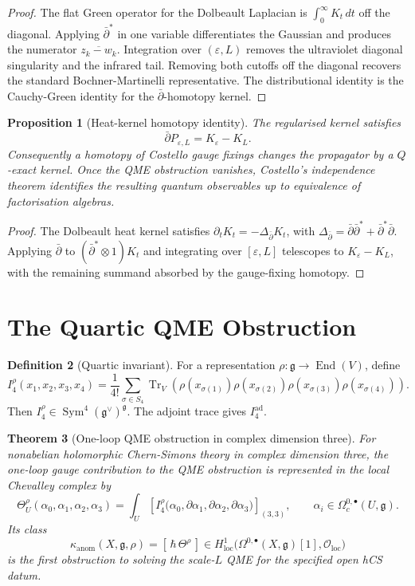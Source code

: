 \documentclass[11pt]{article}
\providecommand{\dbar}{\bar{\partial}}
\providecommand{\dbarstar}{\bar{\partial}^{\ast}}
\providecommand{\fg}{\mathfrak{g}}
\providecommand{\ad}{\operatorname{ad}}
\providecommand{\Tr}{\operatorname{Tr}}
\providecommand{\Sym}{\operatorname{Sym}}
\providecommand{\End}{\operatorname{End}}
\providecommand{\cO}{\mathcal{O}}
\providecommand{\kanom}{\kappa_{\mathrm{anom}}}
\theoremstyle{plain}
\newtheorem{theorem}{Theorem}[section]
\newtheorem{proposition}[theorem]{Proposition}
\theoremstyle{definition}
\newtheorem{definition}[theorem]{Definition}
\theoremstyle{remark}
\begin{document}
\begin{proof}
The flat Green operator for the Dolbeault Laplacian is
\(\int_0^\infty K_t\,dt\) off the diagonal. Applying
\(\dbarstar\) in one variable differentiates the Gaussian and produces
the numerator \(\overline{z_k-w_k}\). Integration over
\((\varepsilon,L)\) removes the ultraviolet diagonal singularity and
the infrared tail. Removing both cutoffs off the diagonal recovers the
standard Bochner-Martinelli representative. The distributional identity
is the Cauchy-Green identity for the \(\dbar\)-homotopy kernel.
\end{proof}

\begin{proposition}[Heat-kernel homotopy identity]
\label{prop:heat-homotopy}
The regularised kernel satisfies
\[
  \dbar P_{\varepsilon,L}=K_\varepsilon-K_L.
\]
Consequently a homotopy of Costello gauge fixings changes the
propagator by a \(Q\)-exact kernel. Once the QME obstruction vanishes,
Costello's independence theorem identifies the resulting quantum
observables up to equivalence of factorisation algebras.
\end{proposition}

\begin{proof}
The Dolbeault heat kernel satisfies
\(\partial_tK_t=-\Delta_{\dbar}K_t\), with
\(\Delta_{\dbar}=\dbar\dbarstar+\dbarstar\dbar\). Applying \(\dbar\) to
\((\dbarstar\otimes 1)K_t\) and integrating over
\([\varepsilon,L]\) telescopes to \(K_\varepsilon-K_L\), with the
remaining summand absorbed by the gauge-fixing homotopy.
\end{proof}

\section{The Quartic QME Obstruction}
\label{sec:qme-obstruction}

\begin{definition}[Quartic invariant]
\label{def:quartic}
For a representation \(\rho:\fg\to\End(V)\), define
\[
  I_4^\rho(x_1,x_2,x_3,x_4)
  =
  \frac1{4!}\sum_{\sigma\in S_4}
  \Tr_V\!\left(
    \rho(x_{\sigma(1)})\rho(x_{\sigma(2)})
    \rho(x_{\sigma(3)})\rho(x_{\sigma(4)})
  \right).
\]
Then \(I_4^\rho\in\Sym^4(\fg^\vee)^\fg\). The adjoint trace gives
\(I_4^{\ad}\).
\end{definition}

\begin{theorem}[One-loop QME obstruction in complex dimension three]
\label{thm:quartic-obstruction}
For nonabelian holomorphic Chern-Simons theory in complex dimension
three, the one-loop gauge contribution to the QME obstruction is
represented in the local Chevalley complex by
\[
  \Theta^\rho_U(\alpha_0,\alpha_1,\alpha_2,\alpha_3)
  =
  \int_U
  \left[
  I_4^\rho\bigl(
    \alpha_0,\partial\alpha_1,\partial\alpha_2,\partial\alpha_3
  \bigr)
  \right]_{(3,3)},
  \qquad
  \alpha_i\in\Omega^{0,\bullet}_c(U,\fg).
\]
Its class
\[
  \kanom(X,\fg,\rho)
  =
  [\,\hbar\,\Theta^\rho\,]
  \in
  H^1_{\mathrm{loc}}
  \bigl(\Omega^{0,\bullet}(X,\fg)[1],\cO_{\mathrm{loc}}\bigr)
\]
is the first obstruction to solving the scale-\(L\) QME for the
specified open hCS datum.
\end{theorem}
\end{document}
